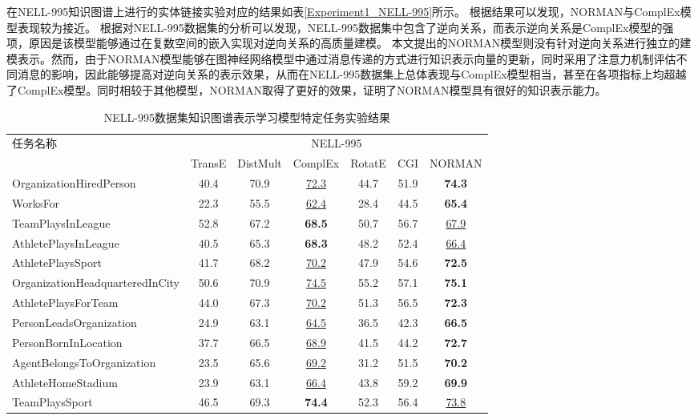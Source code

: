 \documentclass[algorithmlist, AutoFakeBold, AutoFakeSlant, figurelist, tablelist, nomlist, engineering]{seuthesix}
\begin{document}
在NELL-995知识图谱上进行的实体链接实验对应的结果如表\ref{Experiment1_NELL-995}所示。
根据结果可以发现，NORMAN与ComplEx模型表现较为接近。
根据对NELL-995数据集的分析可以发现，NELL-995数据集中包含了逆向关系，而表示逆向关系是ComplEx模型的强项，原因是该模型能够通过在复数空间的嵌入实现对逆向关系的高质量建模。
本文提出的NORMAN模型则没有针对逆向关系进行独立的建模表示。然而，由于NORMAN模型能够在图神经网络模型中通过消息传递的方式进行知识表示向量的更新，同时采用了注意力机制评估不同消息的影响，因此能够提高对逆向关系的表示效果，从而在NELL-995数据集上总体表现与ComplEx模型相当，甚至在各项指标上均超越了ComplEx模型。同时相较于其他模型，NORMAN取得了更好的效果，证明了NORMAN模型具有很好的知识表示能力。

\begin{table}[t]
  \centering
  \caption{NELL-995数据集知识图谱表示学习模型特定任务实验结果}
  \begin{tabular*}{0.95\textwidth}{@{\extracolsep{\fill}}lcccccc}
    \toprule[1pt]
    \multirow{2}{*}{\small{任务名称}} & \multicolumn{6}{c}{\small{NELL-995}} \\
      & \small{TransE} & \small{DistMult} & \small{ComplEx} & \small{RotatE} & \small{CGI} & \small{NORMAN} \\ \hline
    \small{OrganizationHiredPerson} & 40.4 & 70.9 & \underline{72.3} & 44.7 & 51.9 & \textbf{74.3} \\
    \small{WorksFor} & 22.3 & 55.5 & \underline{62.4} & 28.4 & 44.5 & \textbf{65.4} \\
    \small{TeamPlaysInLeague} & 52.8 & 67.2 & \textbf{68.5} & 50.7 & 56.7 & \underline{67.9} \\
    \small{AthletePlaysInLeague} & 40.5 & 65.3 & \textbf{68.3} & 48.2 & 52.4 & \underline{66.4} \\
    \small{AthletePlaysSport} & 41.7 & 68.2 & \underline{70.2} & 47.9 & 54.6 & \textbf{72.5} \\
    \small{OrganizationHeadquarteredInCity} & 50.6 & 70.9 & \underline{74.5} & 55.2 & 57.1 & \textbf{75.1} \\
    \small{AthletePlaysForTeam} & 44.0 & 67.3 & \underline{70.2} & 51.3 & 56.5 & \textbf{72.3} \\
    \small{PersonLeadsOrganization} & 24.9 & 63.1 & \underline{64.5} & 36.5 & 42.3 & \textbf{66.5} \\
    \small{PersonBornInLocation} & 37.7 & 66.5 & \underline{68.9} & 41.5 & 44.2 & \textbf{72.7} \\
    \small{AgentBelongsToOrganization} & 23.5 & 65.6 & \underline{69.2} & 31.2 & 51.5 & \textbf{70.2} \\
    \small{AthleteHomeStadium} & 23.9 & 63.1 & \underline{66.4} & 43.8 & 59.2 & \textbf{69.9} \\
    \small{TeamPlaysSport} & 46.5 & 69.3 & \textbf{74.4} & 52.3 & 56.4 & \underline{73.8} \\
    \bottomrule[1pt]
  \end{tabular*}
  \label{Experiment1_tasks1}
\end{table}
\end{document}
